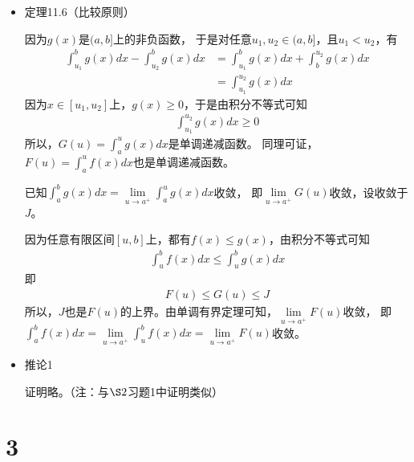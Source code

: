 \documentclass{article}
\begin{document}
\begin{itemize}
  \item 定理11.6（比较原则）

        因为$g(x)$是$(a, b]$上的非负函数，
        于是对任意$u_1, u_2 \in (a, b]$，且$u_1 < u_2$，有
        \begin{align*}
          \int_{u_1}^{b} g(x) dx - \int_{u_2}^{b} g(x) dx
           & = \int_{u_1}^{b} g(x) dx + \int_{b}^{u_2} g(x) dx \\
           & = \int_{u_1}^{u_2} g(x) dx
        \end{align*}
        因为$x \in [u_1, u_2]$上，$g(x) \geq 0$，于是由积分不等式可知
        \begin{align*}
          \int_{u_1}^{u_2} g(x) dx \geq 0
        \end{align*}
        所以，$G(u) = \int_{a}^{u} g(x) dx$是单调递减函数。
        同理可证，$F(u) = \int_{a}^{u} f(x) dx$也是单调递减函数。

        已知$\int_{a}^{b} g(x) dx = \lim \limits_{u \to a^+} \int_{a}^{u} g(x) dx$收敛，
        即$\lim \limits_{u \to a^+} G(u)$收敛，设收敛于$J$。

        因为任意有限区间$[u, b]$上，都有$f(x) \leq g(x)$，由积分不等式可知
        \begin{align*}
          \int_{u}^{b} f(x) dx \leq \int_{u}^{b} g(x) dx
        \end{align*}
        即
        \begin{align*}
          F(u) \leq G(u) \leq J
        \end{align*}
        所以，$J$也是$F(u)$的上界。由单调有界定理可知，$\lim \limits_{u \to a^+} F(u)$收敛，
        即$\int_{a}^{b} f(x) dx = \lim\limits_{u \to a^+} \int_{u}^{b} f(x) dx = \lim \limits_{u \to a^+} F(u)$收敛。

  \item 推论1

        证明略。（注：与$\S 2$习题1中证明类似）
\end{itemize}

\section*{3}
\end{document}
